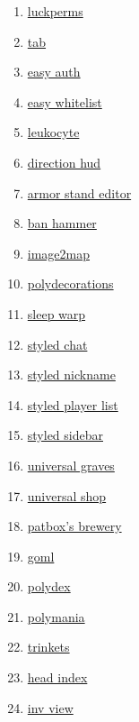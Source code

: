 \begin{enumerate}
    \item \href{https://github.com/LuckPerms/LuckPerms}{luckperms}
    \item \href{https://github.com/NEZNAMY/TAB}{tab}
    \item \href{https://github.com/NikitaCartes/EasyAuth}{easy auth}
    \item \href{https://github.com/NikitaCartes/EasyWhitelist}{easy whitelist}
    \item \href{https://github.com/NucleoidMC/leukocyte}{leukocyte}
    \item \href{https://github.com/Oth3r/DirectionHUD}{direction hud}
    \item \href{https://github.com/Patbox/ArmorStandEditor}{armor stand editor}
    \item \href{https://github.com/Patbox/BanHammer}{ban hammer}
    \item \href{https://github.com/Patbox/Image2Map}{image2map}
    \item \href{https://github.com/Patbox/PolyDecorations}{polydecorations}
    \item \href{https://github.com/Patbox/SleepWarp}{sleep warp}
    \item \href{https://github.com/Patbox/StyledChat}{styled chat}
    \item \href{https://github.com/Patbox/StyledNicknames}{styled nickname}
    \item \href{https://github.com/Patbox/StyledPlayerList}{styled player list}
    \item \href{https://github.com/Patbox/StyledSidebars}{styled sidebar}
    \item \href{https://github.com/Patbox/UniversalGraves}{universal graves}
    \item \href{https://github.com/Patbox/UniversalShops}{universal shop}
    \item \href{https://github.com/Patbox/brewery}{patbox's brewery}
    \item \href{https://github.com/Patbox/get-off-my-lawn-reserved}{goml}
    \item \href{https://github.com/Patbox/polydex}{polydex}
    \item \href{https://github.com/Patbox/polymania}{polymania}
    \item \href{https://github.com/PolymerPorts/trinkets}{trinkets}
    \item \href{https://github.com/PotatoPresident/HeadIndex}{head index}
    \item \href{https://github.com/PotatoPresident/InvView}{inv view}

\end{enumerate}
